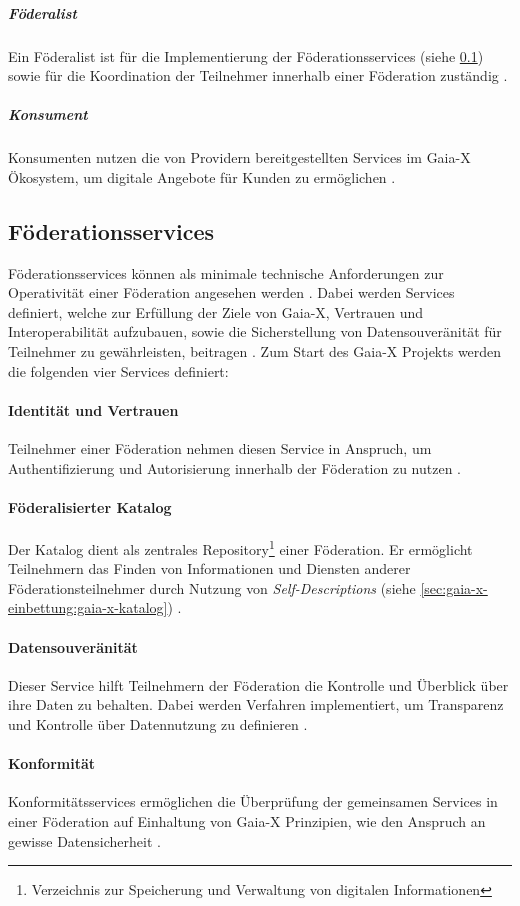 \subparagraph{Föderalist}
Ein Föderalist ist für die Implementierung der Föderationsservices (siehe \ref{subsec:gaia-x:federationservices}) 
sowie für die Koordination der Teilnehmer innerhalb einer Föderation zuständig \cite{GXFS2021}.

\subparagraph{Konsument}
Konsumenten nutzen die von Providern bereitgestellten Services im Gaia-X Ökosystem, um digitale Angebote für Kunden zu ermöglichen \cite{GaiaXArchitecture2021}.

\subsection{Föderationsservices}
\label{subsec:gaia-x:federationservices}
Föderationsservices können als minimale technische Anforderungen zur Operativität einer Föderation angesehen werden \cite{GXFS2021}.
Dabei werden Services definiert, welche zur Erfüllung der Ziele von Gaia-X, Vertrauen und Interoperabilität
aufzubauen, sowie die Sicherstellung von Datensouveränität für Teilnehmer zu gewährleisten, beitragen \cite{GXFS2021}.
Zum Start des Gaia-X Projekts werden die folgenden vier Services definiert:

\paragraph{Identität und Vertrauen}
Teilnehmer einer Föderation nehmen diesen Service in Anspruch, um Authentifizierung und Autorisierung innerhalb der Föderation zu nutzen \cite{GXFS2021}.

\paragraph{Föderalisierter Katalog}
Der Katalog dient als zentrales 
Repository\footnote{Verzeichnis zur Speicherung und Verwaltung von digitalen Informationen} 
einer Föderation.
Er ermöglicht Teilnehmern das Finden von Informationen und Diensten anderer Föderationsteilnehmer durch Nutzung von
\emph{Self-Descriptions} (siehe \ref{sec:gaia-x-einbettung:gaia-x-katalog}) \cite{GXFS2021}.

\paragraph{Datensouveränität}
Dieser Service hilft Teilnehmern der Föderation die Kontrolle und Überblick über ihre Daten zu behalten.
Dabei werden Verfahren implementiert, um Transparenz und Kontrolle über Datennutzung zu definieren \cite{GXFS2021}.

\paragraph{Konformität}
Konformitätsservices ermöglichen die Überprüfung der gemeinsamen Services in einer Föderation auf Einhaltung
von Gaia-X Prinzipien, wie den Anspruch an gewisse Datensicherheit \cite{GXFS2021}.
